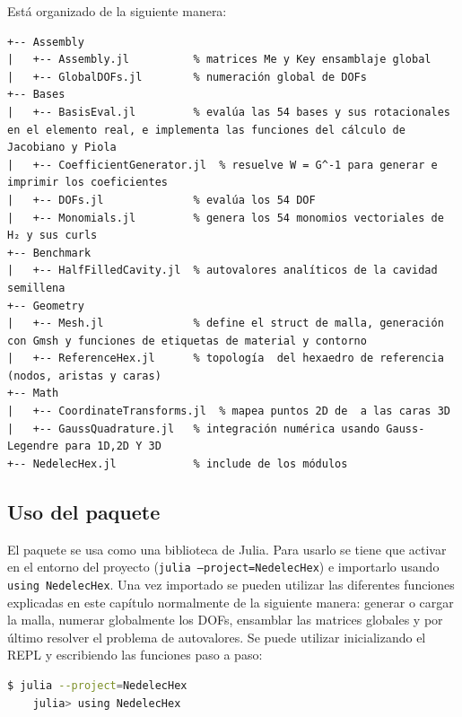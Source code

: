 \documentclass[12pt]{report} %
\begin{document}
Está organizado de la siguiente manera:
\begin{lstlisting}[captionpos=b, caption={Estructura del directorio \texttt{src/} del paquete \texttt{NedelecHex}.}, label=cod:estructura]
+-- Assembly
|   +-- Assembly.jl          % matrices Me y Key ensamblaje global 
|   +-- GlobalDOFs.jl        % numeración global de DOFs 
+-- Bases
|   +-- BasisEval.jl         % evalúa las 54 bases y sus rotacionales en el elemento real, e implementa las funciones del cálculo de Jacobiano y Piola
|   +-- CoefficientGenerator.jl  % resuelve W = G^-1 para generar e imprimir los coeficientes
|   +-- DOFs.jl              % evalúa los 54 DOF
|   +-- Monomials.jl         % genera los 54 monomios vectoriales de H₂ y sus curls
+-- Benchmark
|   +-- HalfFilledCavity.jl  % autovalores analíticos de la cavidad semillena 
+-- Geometry
|   +-- Mesh.jl              % define el struct de malla, generación con Gmsh y funciones de etiquetas de material y contorno
|   +-- ReferenceHex.jl      % topología  del hexaedro de referencia (nodos, aristas y caras)
+-- Math
|   +-- CoordinateTransforms.jl  % mapea puntos 2D de  a las caras 3D 
|   +-- GaussQuadrature.jl   % integración numérica usando Gauss-Legendre para 1D,2D Y 3D
+-- NedelecHex.jl            % include de los módulos
\end{lstlisting}

\subsection{Uso del paquete}\label{sec:uso}
El paquete se usa como una biblioteca de Julia. Para usarlo se tiene que activar en  el entorno del proyecto (\texttt{julia --project=NedelecHex}) e importarlo usando \texttt{using NedelecHex}. Una vez importado se pueden utilizar las diferentes funciones explicadas en este capítulo normalmente de la siguiente manera: generar o cargar la malla, numerar globalmente los DOFs, ensamblar las matrices globales y por último resolver el problema de autovalores. Se puede utilizar inicializando el REPL y escribiendo las funciones paso a paso:
\begin{lstlisting}[language=bash, captionpos=b, caption={Activación del entorno y carga del paquete en el REPL.}, label=cod:repl]
	$ julia --project=NedelecHex
	julia> using NedelecHex
\end{lstlisting} 
\end{document}

